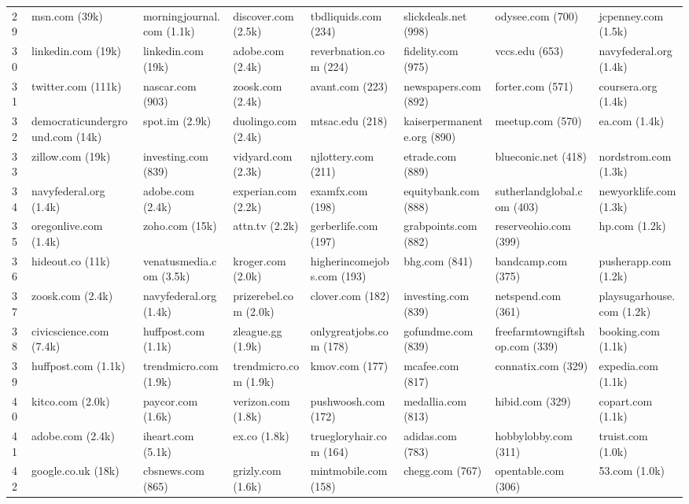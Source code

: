 \documentclass[12pt, letterpaper]{article}
\begin{document}
\begin{table}[ht]
\begin{adjustbox}{max width=\textwidth}
\begin{tabular}{@{\hspace{0\tabcolsep}}llllllll@{\hspace{0\tabcolsep}}}
29 & msn.com (39k) & morningjournal.com (1.1k) & discover.com (2.5k) & tbdliquids.com (234) & slickdeals.net (998) & odysee.com (700) & jcpenney.com (1.5k) \\
30 & linkedin.com (19k) & linkedin.com (19k) & adobe.com (2.4k) & reverbnation.com (224) & fidelity.com (975) & vccs.edu (653) & navyfederal.org (1.4k) \\
31 & twitter.com (111k) & nascar.com (903) & zoosk.com (2.4k) & avant.com (223) & newspapers.com (892) & forter.com (571) & coursera.org (1.4k) \\
32 & democraticunderground.com (14k) & spot.im (2.9k) & duolingo.com (2.4k) & mtsac.edu (218) & kaiserpermanente.org (890) & meetup.com (570) & ea.com (1.4k) \\
33 & zillow.com (19k) & investing.com (839) & vidyard.com (2.3k) & njlottery.com (211) & etrade.com (889) & blueconic.net (418) & nordstrom.com (1.3k) \\
34 & navyfederal.org (1.4k) & adobe.com (2.4k) & experian.com (2.2k) & examfx.com (198) & equitybank.com (888) & sutherlandglobal.com (403) & newyorklife.com (1.3k) \\
35 & oregonlive.com (1.4k) & zoho.com (15k) & attn.tv (2.2k) & gerberlife.com (197) & grabpoints.com (882) & reserveohio.com (399) & hp.com (1.2k) \\
36 & hideout.co (11k) & venatusmedia.com (3.5k) & kroger.com (2.0k) & higherincomejobs.com (193) & bhg.com (841) & bandcamp.com (375) & pusherapp.com (1.2k) \\
37 & zoosk.com (2.4k) & navyfederal.org (1.4k) & prizerebel.com (2.0k) & clover.com (182) & investing.com (839) & netspend.com (361) & playsugarhouse.com (1.2k) \\
38 & civicscience.com (7.4k) & huffpost.com (1.1k) & zleague.gg (1.9k) & onlygreatjobs.com (178) & gofundme.com (839) & freefarmtowngiftshop.com (339) & booking.com (1.1k) \\
39 & huffpost.com (1.1k) & trendmicro.com (1.9k) & trendmicro.com (1.9k) & kmov.com (177) & mcafee.com (817) & connatix.com (329) & expedia.com (1.1k) \\
40 & kitco.com (2.0k) & paycor.com (1.6k) & verizon.com (1.8k) & pushwoosh.com (172) & medallia.com (813) & hibid.com (329) & copart.com (1.1k) \\
41 & adobe.com (2.4k) & iheart.com (5.1k) & ex.co (1.8k) & truegloryhair.com (164) & adidas.com (783) & hobbylobby.com (311) & truist.com (1.0k) \\
42 & google.co.uk (18k) & cbsnews.com (865) & grizly.com (1.6k) & mintmobile.com (158) & chegg.com (767) & opentable.com (306) & 53.com (1.0k) \\

\end{tabular}
\end{adjustbox}
\end{table}
\end{document}
